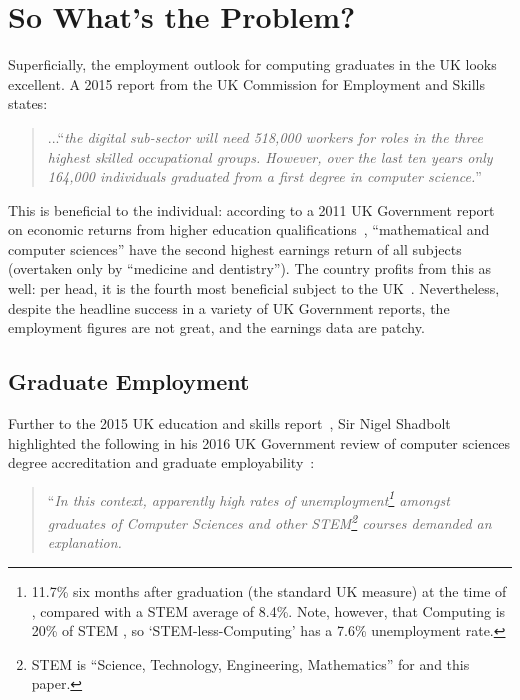 \documentclass[conference]{IEEEtran}
\begin{document}
\section{So What's the Problem?}\label{problem}

Superficially, the employment outlook for computing graduates in the
UK looks excellent. A 2015 report from the UK Commission for
Employment and Skills~\cite[p.~74]{UKCES2015b} states:

\begin{quote} ...``{\emph{the digital sub-sector will need 518,000 workers for
roles in the three highest skilled occupational groups. However, over
the last ten years only 164,000 individuals graduated from a first
degree in computer science.}}''
\end{quote} 

This is beneficial to the individual: according to a 2011 UK
Government report on economic returns from higher education
qualifications~\cite[Figure 4]{BIS2011a}, ``mathematical and
computer sciences'' have the second highest earnings return of all
subjects (overtaken only by ``medicine and dentistry'').  The country
profits from this as well: per head, it is the fourth most beneficial
subject to the UK~\cite[p.~16]{BIS2011a}. Nevertheless, despite the
headline success in a variety of UK Government reports, the employment
figures are not great, and the earnings data are patchy.

\subsection{Graduate Employment}

Further to the 2015 UK education and skills report~\cite{UKCES2015b},
Sir Nigel Shadbolt highlighted the following in his 2016 UK Government
review of
computer sciences degree accreditation and graduate
employability~\cite{Shadbolt2016a}:

\begin{quote} ``{\emph{In this context, apparently high rates of
unemployment\footnote{11.7\% six months after graduation (the standard
UK measure) at the time of \cite{Shadbolt2016a}, compared with a STEM
average of 8.4\%. Note, however, that Computing is 20\% of STEM
\cite[Table 1]{Wakeham2016a}, so `STEM-less-Computing' has a 7.6\%
unemployment rate.} amongst graduates of Computer Sciences and other
STEM\footnote{STEM is ``Science, Technology, Engineering,
Mathematics'' for \cite{Shadbolt2016a} and this paper.} courses
demanded an explanation.}}
\end{quote}
\end{document}
